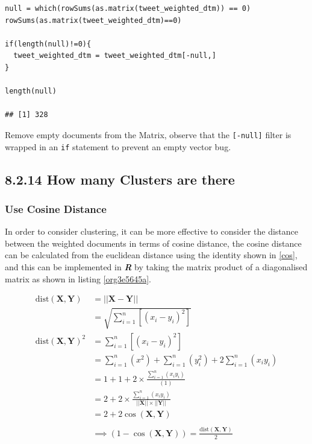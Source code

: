\documentclass[11pt]{article}
\begin{document}
\begin{listing}[htbp]
\begin{verbatim}
null = which(rowSums(as.matrix(tweet_weighted_dtm)) == 0)
rowSums(as.matrix(tweet_weighted_dtm)==0)

if(length(null)!=0){
  tweet_weighted_dtm = tweet_weighted_dtm[-null,]
}

length(null)

## [1] 328
\end{verbatim}
\caption{\label{org87c6597}Remove empty documents from the Matrix, observe that the \texttt{[-null]} filter is wrapped in an \texttt{if} statement to prevent an empty vector bug.}
\end{listing}
\subsection{8.2.14 How many Clusters are there}
\label{sec:orgb2f0bb9}
\subsubsection{Use Cosine Distance}
\label{sec:org8c5c267}
In order to consider clustering, it can be more effective to consider the distance between the weighted documents in terms of cosine distance, the cosine distance can be calculated from the euclidean distance using the identity shown in \eqref{cos}, and this can be implemented in \textbf{\emph{R}} by taking the matrix product of a diagonalised matrix as shown in listing \ref{org3e5645a}.

\begin{align}
\mathrm{dist}\left( \mathbf{X}, \mathbf{Y} \right)&= \left| \left| \mathbf{X}-\mathbf{Y} \right| \right| \\
&= \sqrt{\sum^{n}_{i= 1}   \left[ \left( x_i-y_i \right)^2 \right] } \\
\mathrm{dist}\left( \mathbf{X}, \mathbf{Y} \right)^2&= \sum^{n}_{i= 1}  \left[ \left( x_i-y_i \right)^2 \right] \\
&= \sum^{n}_{i= 1}   \left( x^2 \right)+  \sum^{n}_{i= 1}   \left( y_i^2 \right)+ 2 \sum^{n}_{i= 1}   \left( x_iy_i \right) \\
&= 1+ 1 +  2 \times  \frac{\sum^{n}_{i= 1}   \left( x_iy_i \right)}{\left( 1 \right) }\\
&= 2+ 2\times \frac{\sum^{n}_{i= 1}   \left( x_iy_i \right)}{\left| \left| \mathbf{X} \right| \right|\times \left| \left| \mathbf{Y} \right| \right|}\\
&= 2+ 2 \cos\left( \mathbf{X}, \mathbf{Y} \right)\\
\ \\
& \implies  \left( 1- \cos\left( \mathbf{X}, \mathbf{Y} \right) \right) = \frac{\mathrm{dist}\left( \mathbf{X}, \mathbf{Y} \right)}{2} \label{cos}
\end{align}
\end{document}
